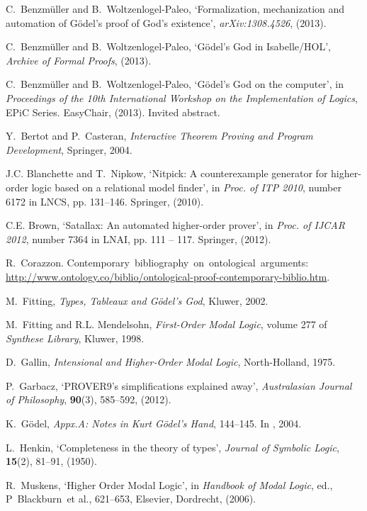 \documentclass{birkjour}
\theoremstyle{definition}
\theoremstyle{remark}
\numberwithin{equation}{section}
\begin{document}
\begin{thebibliography}{1}
C.~Benzm{\"u}ller and B.~Woltzenlogel-Paleo, `Formalization, mechanization and
  automation of {G{\"o}del's} proof of {God's} existence', {\em
  arXiv:1308.4526}, (2013).

C.~Benzm\"uller and B.~Woltzenlogel-Paleo, `{G{\"o}del's God in Isabelle/HOL}',
  {\em Archive of Formal Proofs}, (2013).

C.~Benzm\"uller and B.~Woltzenlogel-Paleo, `G\"odel's {God} on the computer',
  in {\em Proceedings of the 10th International Workshop on the Implementation
  of Logics}, EPiC Series. EasyChair, (2013).
\newblock Invited abstract.

Y.~Bertot and P.~Casteran, {\em {Interactive Theorem Proving and Program
  Development}}, Springer, 2004.

J.C. Blanchette and T.~Nipkow, `Nitpick: A counterexample generator for
  higher-order logic based on a relational model finder', in {\em Proc. of ITP
  2010}, number 6172 in LNCS, pp. 131--146. Springer, (2010).

C.E. Brown, `Satallax: An automated higher-order prover', in {\em Proc. of
  IJCAR 2012}, number 7364 in LNAI, pp. 111 -- 117. Springer, (2012).

R.~Corazzon.
\newblock Contemporary~bibliography~on~ontological~arguments: {\scriptsize
  \url{http://www.ontology.co/biblio/ontological-proof-contemporary-biblio.htm}}.

M.~Fitting, {\em Types, Tableaux and G\"odel's God}, Kluwer, 2002.

M.~Fitting and R.L. Mendelsohn, {\em First-Order Modal Logic}, volume 277 of
  {\em Synthese Library}, Kluwer, 1998.

D.~Gallin, {\em Intensional and Higher-Order Modal Logic}, North-Holland, 1975.

P.~Garbacz, `{PROVER9's} simplifications explained away', {\em Australasian
  Journal of Philosophy}, {\bf 90}(3),  585--592, (2012).

K.~G\"odel, {\em Appx.A: Notes in Kurt G\"odel's Hand},  144--145.
\newblock In  \cite{sobel2004logic}, 2004.

L.~Henkin, `Completeness in the theory of types', {\em Journal of Symbolic
  Logic}, {\bf 15}(2),  81--91, (1950).

R.~Muskens, `{Higher Order Modal Logic}', in {\em Handbook of Modal Logic},
  ed., P~Blackburn~et al.,  621--653, Elsevier, Dordrecht, (2006).


\end{thebibliography}
\end{document}
